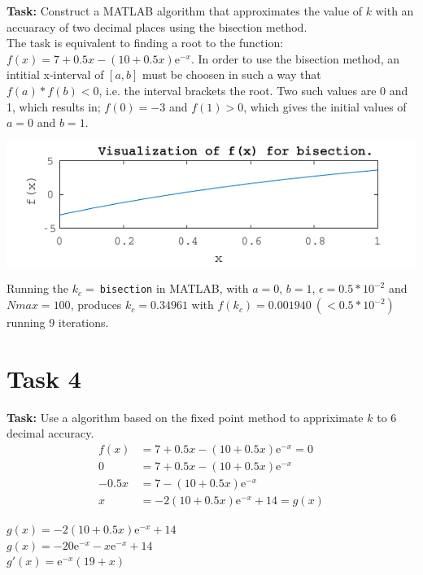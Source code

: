 \documentclass{article}
\begin{document}
  \textbf{Task:}
  Construct a MATLAB algorithm that approximates the value of $k$ with an
  accuaracy of two decimal places using the bisection method. \\

  \noindent
  The task is equivalent to finding a root to the function:
  $ f(x) = 7 + 0.5x - (10 + 0.5x)\mathrm{e}^{-x} $.
  In order to use the bisection method, an intitial x-interval of $[a, b]$ must
  be choosen in such a way that $f(a) * f(b) < 0$, i.e. the interval brackets the
  root. Two such values are 0 and 1, which results in; $f(0) = -3$ and $f(1) >
  0$, which gives the initial values of $a=0$ and $b=1$.

  \begin{center}
    \includegraphics{figs/t3_check.pdf}
  \end{center}

  \noindent
  Running the $k_c =\ $\texttt{bisection} in MATLAB, with $a=0$, $b=1$,
  $\epsilon=0.5*10^{-2}$ and $Nmax=100$, produces $k_c = 0.34961$ with $f(k_c) =
  0.001940 \ ( < 0.5*10^{-2} )$ running 9 iterations.

\section*{Task 4}

  \textbf{Task:}
  Use a algorithm based on the fixed point method to appriximate
  $k$ to 6 decimal accuracy.
  \begin{align*}
     f(x) &= 7 + 0.5x - (10 + 0.5x)\mathrm{e}^{-x} = 0\\
     0  &= 7 + 0.5x - (10 + 0.5x)\mathrm{e}^{-x} \\
     - 0.5x  &= 7 - (10 + 0.5x)\mathrm{e}^{-x} \\
     x  &= -2(10 + 0.5x)\mathrm{e}^{-x} + 14  = g(x)
  \end{align*}

  \noindent
  $ g(x) = -2(10 + 0.5x)\mathrm{e}^{-x} + 14 $ \\
  $ g(x) = -20\mathrm{e}^{-x} - x\mathrm{e}^{-x} + 14 $ \\
  $ g'(x) = \mathrm{e}^{-x}(19 + x)$ \\
\end{document}
